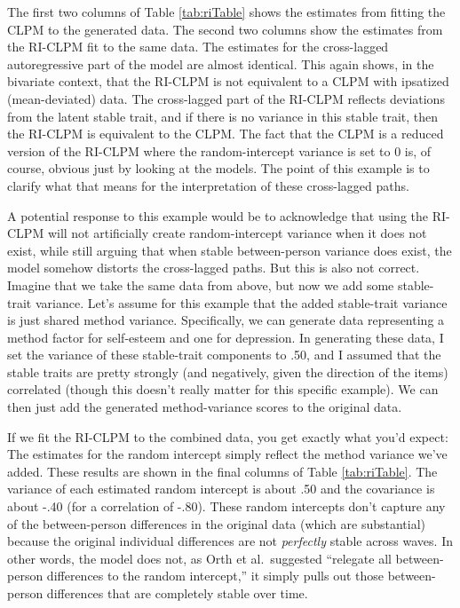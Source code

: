 \documentclass[
  english,
  man,floatsintext]{apa6}
\begin{document}
The first two columns of Table \ref{tab:riTable} shows the estimates from fitting the CLPM to the generated data. The second two columns show the estimates from the RI-CLPM fit to the same data. The estimates for the cross-lagged autoregressive part of the model are almost identical. This again shows, in the bivariate context, that the RI-CLPM is not equivalent to a CLPM with ipsatized (mean-deviated) data. The cross-lagged part of the RI-CLPM reflects deviations from the latent stable trait, and if there is no variance in this stable trait, then the RI-CLPM is equivalent to the CLPM. The fact that the CLPM is a reduced version of the RI-CLPM where the random-intercept variance is set to 0 is, of course, obvious just by looking at the models. The point of this example is to clarify what that means for the interpretation of these cross-lagged paths.

A potential response to this example would be to acknowledge that using the RI-CLPM will not artificially create random-intercept variance when it does not exist, while still arguing that when stable between-person variance does exist, the model somehow distorts the cross-lagged paths. But this is also not correct. Imagine that we take the same data from above, but now we add some stable-trait variance. Let's assume for this example that the added stable-trait variance is just shared method variance. Specifically, we can generate data representing a method factor for self-esteem and one for depression. In generating these data, I set the variance of these stable-trait components to .50, and I assumed that the stable traits are pretty strongly (and negatively, given the direction of the items) correlated (though this doesn't really matter for this specific example). We can then just add the generated method-variance scores to the original data.

If we fit the RI-CLPM to the combined data, you get exactly what you'd expect: The estimates for the random intercept simply reflect the method variance we've added. These results are shown in the final columns of Table \ref{tab:riTable}. The variance of each estimated random intercept is about .50 and the covariance is about -.40 (for a correlation of -.80). These random intercepts don't capture any of the between-person differences in the original data (which are substantial) because the original individual differences are not \emph{perfectly} stable across waves. In other words, the model does not, as Orth et al.~suggested ``relegate all between-person differences to the random intercept,'' it simply pulls out those between-person differences that are completely stable over time.
\end{document}
